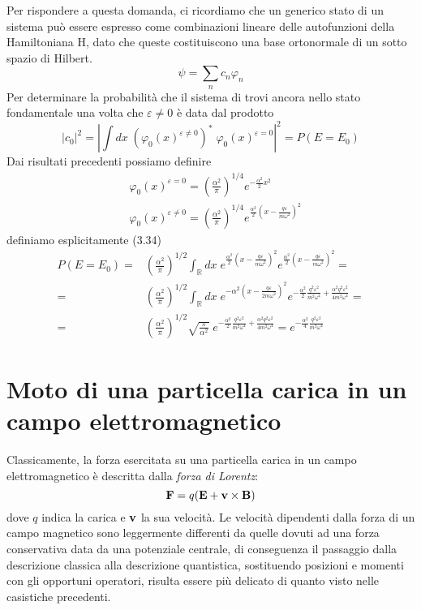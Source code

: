 Per rispondere a questa domanda, ci ricordiamo che un generico stato di un sistema pu\`o essere espresso come combinazioni lineare delle autofunzioni della Hamiltoniana H, dato che queste costituiscono una base ortonormale di un sotto spazio di Hilbert.
\begin{equation*}
	\psi = \sum_{n} c_n \varphi_{n}
\end{equation*}  
Per determinare la probabilit\`a che il sistema di trovi ancora nello stato fondamentale una volta che $\varepsilon \neq 0$ \`e data dal prodotto
\begin{equation}
	|c_0|^2 = \left |\int dx \; (\varphi_0(x)^{\varepsilon \neq 0})^* \; \varphi_0(x)^{\varepsilon = 0} \right | ^2 = P(E = E_0)
\end{equation}
Dai risultati precedenti possiamo definire
\begin{align*}
	& \varphi_0 (x)^{\varepsilon = 0} = \left ( \frac{\alpha^2}{\pi}\right )^{1/4} e^{-\frac{\alpha^2}{2}x^2} \\[0.5cm]
	& \varphi_0(x)^{\varepsilon \neq 0} = \left ( \frac{\alpha^2}{\pi}\right )^{1/4} e^{\frac{\alpha^2}{2}\left (x- \frac{q\varepsilon}{m\omega^2}\right)^2}
\end{align*}
definiamo esplicitamente (3.34) 
\begin{align*}
	P(E=E_0) = &\left ( \frac{\alpha^2}{\pi}\right )^{1/2} \int_{\mathbb{R}}dx \; e^{\frac{\alpha^2}{2}\left (x- \frac{q\varepsilon}{m\omega^2}\right)^2}e^{\frac{\alpha^2}{2}\left (x- \frac{q\varepsilon}{m\omega^2}\right)^2} = \\[0.5cm]
	 = & \left ( \frac{\alpha^2}{\pi}\right )^{1/2} \int_{\mathbb{R}}dx \; e^{- \alpha^2 \left ( x - \frac{q\varepsilon}{2m\omega^2}\right)^2} e^{-\frac{\alpha^2}{2}\frac{q^2\varepsilon^2}{m^2\omega^4} + \frac{\alpha^2 q^2\varepsilon^2}{4m^2\omega^4}} = \\[0.5cm]
	 = & \left ( \frac{\alpha^2}{\pi}\right )^{1/2} \sqrt{\frac{\pi}{\alpha^2}} \; e^{-\frac{\alpha^2}{2}\frac{q^2\varepsilon^2}{m^2\omega^4} + \frac{\alpha^2 q^2\varepsilon^2}{4m^2\omega^4}} = e^{- \frac{\alpha^2}{4}\frac{q^2 \varepsilon^2}{m^2 \omega^4}}
\end{align*}

\section{Moto di una particella carica in un campo elettromagnetico}

Classicamente, la forza esercitata su una particella carica in un campo elettromagnetico \`e descritta dalla \textit{forza di Lorentz}:
\begin{equation*}
	\bold{F} = q(\bold{E} + \bold{v} \times \bold{B})
\end{equation*}
dove $q$ indica la carica e $\bold{v}$ la sua velocit\`a. Le velocit\`a dipendenti dalla forza di un campo magnetico sono leggermente differenti da quelle dovuti ad una forza conservativa data da una potenziale centrale, di conseguenza il passaggio dalla descrizione classica alla descrizione quantistica, sostituendo posizioni e momenti con gli opportuni operatori, risulta essere pi\`u delicato di quanto visto nelle casistiche precedenti.

